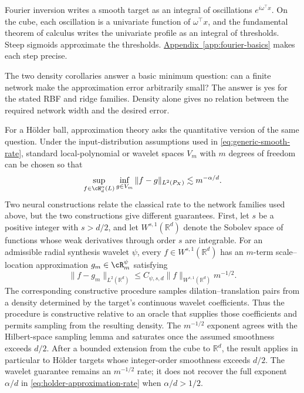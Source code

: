 \documentclass[11pt,twoside]{article}
\newcommand{\appendixref}[1]{\hyperref[#1]{Appendix~\ref*{#1}}}
\newcommand{\R}{\mathbb R}
\theoremstyle{definition}
\theoremstyle{remark}
\begin{document}
Fourier inversion writes a smooth target as an integral of oscillations
\(e^{i\omega^\top x}\). On the cube, each oscillation is a univariate
function of \(\omega^\top x\), and the fundamental theorem of calculus writes
the univariate profile as an integral of thresholds. Steep sigmoids
approximate the thresholds. \appendixref{app:fourier-basics} makes each step
precise.

The two density corollaries answer a basic minimum question: can a finite
network make the approximation error arbitrarily small? The answer is yes for
the stated RBF and ridge families. Density alone gives no relation between the
required network width and the desired error.

For a H\"older ball, approximation theory asks the quantitative version of
the same question. Under the input-distribution assumptions used in
\cref{eq:generic-smooth-rate}, standard local-polynomial or wavelet spaces
\(V_m\) with \(m\) degrees of freedom can be chosen so that
\begin{equation}
 \sup_{f\in\cH_d^\alpha(L)}\inf_{g\in V_m}
 \|f-g\|_{L^2(P_X)}\lesssim m^{-\alpha/d}.
 \label{eq:holder-approximation-rate}
\end{equation}
Two neural constructions relate the classical rate to the network families
used above, but the two constructions give different guarantees. First, let
\(s\) be a positive integer with \(s>d/2\), and let
\(W^{s,1}(\R^d)\) denote the Sobolev space of functions whose weak derivatives
through order \(s\) are integrable. For an admissible radial synthesis wavelet
\(\psi\), every \(f\in W^{s,1}(\R^d)\) has an \(m\)-term scale--location
approximation \(g_m\in\cR_m^\psi\) satisfying
\begin{equation}
 \|f-g_m\|_{L^2(\R^d)}
 \leq C_{\psi,s,d}\|f\|_{W^{s,1}(\R^d)}m^{-1/2}.
 \label{eq:delyon-wavelet-rate}
\end{equation}
The corresponding constructive procedure samples dilation--translation pairs
from a density determined by the target's continuous wavelet coefficients.
Thus the procedure is constructive relative to an oracle that supplies those
coefficients and permits sampling from the resulting density. The
\(m^{-1/2}\) exponent agrees with the Hilbert-space sampling lemma and
saturates once the assumed smoothness exceeds \(d/2\).
After a bounded extension from the cube to \(\R^d\), the result applies in
particular to H\"older targets whose integer-order smoothness exceeds \(d/2\).
The wavelet guarantee remains an \(m^{-1/2}\) rate; it does not recover the
full exponent \(\alpha/d\) in \cref{eq:holder-approximation-rate} when
\(\alpha/d>1/2\).
\end{document}
